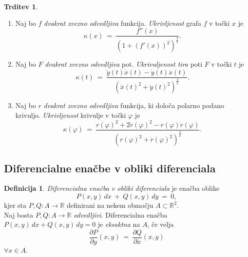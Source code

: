 \documentclass[11pt]{article}
\theoremstyle{definition}
\newtheorem{definicija}{Definicija}[section]
\theoremstyle{definition}
\newtheorem{trditev}{Trditev}[section]
\theoremstyle{definition}
\theoremstyle{theorem}
\begin{document}
\begin{trditev}
~
\begin{enumerate}

	\item[(1)] Naj bo $f$ \textit{dvakrat zvezno odvedljiva} funkcija. \textit{Ukrivljenost} grafa $f$ v točki $x$ je
	$$\kappa(x) ~=~ \frac{f''(x)}{(1+(f'(x))^2)^\frac{3}{2}}.$$
	
	\item[(2)] Naj bo $F$ \textit{dvakrat zvezno odvedljiva} pot. \textit{Ukrivuljenost tira} poti $F$ v točki $t$ je
	$$\kappa(t) ~=~ \frac{\ddot{y}(t) \dot{x}(t) - \dot{y}(t) \ddot{x}(t)}{(\dot{x}(t)^2 + \dot{y}(t)^2)^\frac{3}{2}}.$$
	
	\item[(3)] Naj  bo $r$ \textit{dvakrat zvezno odvedljiva} funkcija, ki določa polarno podano krivuljo. \textit{Ukrivljenost} krivulje v točki $\varphi$ je
	$$\kappa(\varphi) ~=~ \frac{r(\varphi)^2 + 2\dot{r}(\varphi)^2 - r(\varphi)\ddot{r}(\varphi)}{(r(\varphi)^2 + \dot{r}(\varphi)^2)^\frac{3}{2}}.$$

\end{enumerate}

\end{trditev}
\vspace{0.5cm}


\subsection{Diferencialne enačbe v obliki diferenciala}
\vspace{0.5cm}

\begin{definicija}

\textit{Diferencialna enačba v obliki diferenciala} je enačba oblike 
$$P(x, y)\,dx ~+~ Q(x, y)\,dy ~=~ 0,$$
kjer sta $P, Q: A \rightarrow \mathbb{R}$ definirani na nekem območju $A \subset \mathbb{R}^2$. \\

Naj bosta $P, Q: A \rightarrow \mathbb{R}$ \textit{odvedljivi}. Diferencialna enačba \\$P(x, y)\,dx + Q(x, y)\,dy = 0$ je \textit{eksaktna} na $A$, če velja 
$$\frac{\partial P}{\partial y}(x, y) ~=~ \frac{\partial Q}{\partial x}(x, y)$$
$\forall x \in A$.

\end{definicija}
\vspace{0.5cm}
\end{document}
